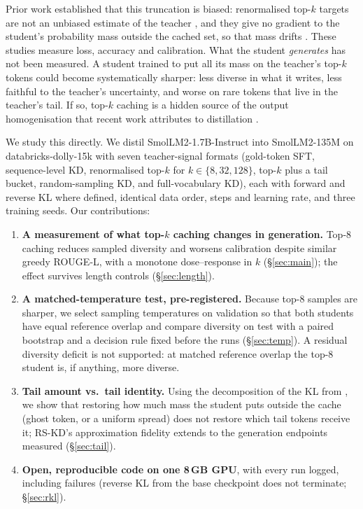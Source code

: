 \documentclass[11pt]{article}
\begin{document}
Prior work established that this truncation is biased: renormalised top-$k$ targets are not an unbiased estimate of
the teacher \citep{anshumann2025sparse}, and they give no gradient to the student's probability mass outside the
cached set, so that mass drifts \citep{topkgradient2026}. These studies measure loss, accuracy and calibration.
What the student \emph{generates} has not been measured. A student trained to put all its mass on the teacher's
top-$k$ tokens could become systematically sharper: less diverse in what it writes, less faithful to the teacher's
uncertainty, and worse on rare tokens that live in the teacher's tail. If so, top-$k$ caching is a hidden source
of the output homogenisation that recent work attributes to distillation \citep{quantdistill2025}.

We study this directly. We distil SmolLM2-1.7B-Instruct into SmolLM2-135M on databricks-dolly-15k with seven
teacher-signal formats (gold-token SFT, sequence-level KD, renormalised top-$k$ for $k\in\{8,32,128\}$, top-$k$
plus a tail bucket, random-sampling KD, and full-vocabulary KD), each with forward and reverse KL where defined,
identical data order, steps and learning rate, and three training seeds. Our contributions:
\begin{enumerate}
\item \textbf{A measurement of what top-$k$ caching changes in generation.} Top-8 caching reduces sampled
  diversity and worsens calibration despite similar greedy ROUGE-L, with a monotone dose--response in $k$
  (\S\ref{sec:main}); the effect survives length controls (\S\ref{sec:length}).
\item \textbf{A matched-temperature test, pre-registered.} Because top-8 samples are sharper, we select sampling
  temperatures on validation so that both students have equal reference overlap and compare diversity on test
  with a paired bootstrap and a decision rule fixed before the runs (\S\ref{sec:temp}). A residual diversity deficit
  is not supported: at matched reference overlap the top-8 student is, if anything, more diverse.
\item \textbf{Tail amount vs.\ tail identity.} Using the decomposition of the KL from \citet{dasgupta2026tad}, we
  show that restoring how much mass the student puts outside the cache (ghost token, or a uniform spread) does not
  restore which tail tokens receive it; RS-KD's approximation fidelity extends to the generation endpoints measured
  (\S\ref{sec:tail}).
\item \textbf{Open, reproducible code on one 8\,GB GPU}, with every run logged, including failures (reverse KL
  from the base checkpoint does not terminate; \S\ref{sec:rkl}).
\end{enumerate}
\end{document}
